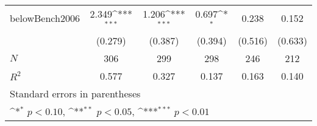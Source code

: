 {
\def\sym#1{\ifmmode^{#1}\else\(^{#1}\)\fi}
\begin{tabular}{l*{5}{c}}
\toprule
\midrule
belowBench2006&    2.349\sym{***}&    1.206\sym{***}&    0.697\sym{*}  &    0.238         &    0.152         \\
          &  (0.279)         &  (0.387)         &  (0.394)         &  (0.516)         &  (0.633)         \\
\midrule
\(N\)     &      306         &      299         &      298         &      246         &      212         \\
\(R^{2}\) &    0.577         &    0.327         &    0.137         &    0.163         &    0.140         \\
\bottomrule
\multicolumn{6}{l}{\footnotesize Standard errors in parentheses}\\
\multicolumn{6}{l}{\footnotesize \sym{*} \(p<0.10\), \sym{**} \(p<0.05\), \sym{***} \(p<0.01\)}\\
\end{tabular}
}
